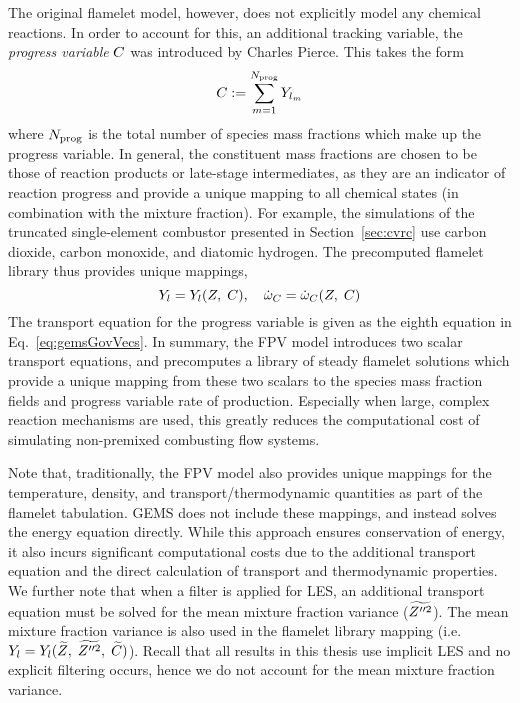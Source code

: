 The original flamelet model, however, does not explicitly model any chemical reactions. In order to account for this, an additional tracking variable, the \textit{progress variable} $C$ was introduced by Charles Pierce. This takes the form
%
\begin{equation}\label{eq:progVarDef}
	C := \sum_{m = 1}^{N_{\text{prog}}} Y_{l_{m}}
\end{equation}
%
where $N_{\text{prog}}$ is the total number of species mass fractions which make up the progress variable. In general, the constituent mass fractions are chosen to be those of reaction products or late-stage intermediates, as they are an indicator of reaction progress and provide a unique mapping to all chemical states (in combination with the mixture fraction). For example, the simulations of the truncated single-element combustor presented in Section~\ref{sec:cvrc} use carbon dioxide, carbon monoxide, and diatomic hydrogen. The precomputed flamelet library thus provides unique mappings,
%
\begin{equation}
	Y_{l} = Y_{l}(Z, \; C), \quad \dot{\omega}_{C} = \dot{\omega}_{C}(Z, \; C)
\end{equation}
%
The transport equation for the progress variable is given as the eighth equation in Eq.~\ref{eq:gemsGovVecs}. In summary, the FPV model introduces two scalar transport equations, and precomputes a library of steady flamelet solutions which provide a unique mapping from these two scalars to the species mass fraction fields and progress variable rate of production. Especially when large, complex reaction mechanisms are used, this greatly reduces the computational cost of simulating non-premixed combusting flow systems.

Note that, traditionally, the FPV model also provides unique mappings for the temperature, density, and transport/thermodynamic quantities as part of the flamelet tabulation. GEMS does not include these mappings, and instead solves the energy equation directly. While this approach ensures conservation of energy, it also incurs significant computational costs due to the additional transport equation and the direct calculation of transport and thermodynamic properties. We further note that when a filter is applied for LES, an additional transport equation must be solved for the mean mixture fraction variance ($\widetilde{Z''^2}$). The mean mixture fraction variance is also used in the flamelet library mapping (i.e. $Y_{l} = Y_{l}(\widetilde{Z}, \; \widetilde{Z''^2}, \; \widetilde{C})$). Recall that all results in this thesis use implicit LES and no explicit filtering occurs, hence we do not account for the mean mixture fraction variance.